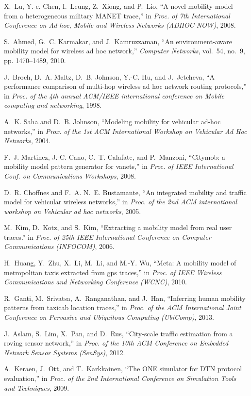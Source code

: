 \documentclass[10pt,conference,compsocconf,letterpaper]{IEEEtran}
\begin{document}
\begin{thebibliography}{10}

X.~Lu, Y.-c. Chen, I.~Leung, Z.~Xiong, and P.~Lio, ``A novel mobility model
  from a heterogeneous military MANET trace,'' in \emph{Proc. of 7th International Conference on Ad-hoc, Mobile and Wireless Networks (ADHOC-NOW)}, 2008.

S.~Ahmed, G.~C. Karmakar, and J.~Kamruzzaman, ``An environment-aware mobility
  model for wireless ad hoc network,'' \emph{Computer Networks}, vol.~54,
  no.~9, pp. 1470--1489, 2010.

J.~Broch, D.~A. Maltz, D.~B. Johnson, Y.-C. Hu, and J.~Jetcheva, ``A
  performance comparison of multi-hop wireless ad hoc network routing
  protocols,'' in \emph{Proc. of the 4th annual ACM/IEEE international
  conference on Mobile computing and networking}, 1998.

A.~K. Saha and D.~B. Johnson, ``Modeling mobility for vehicular ad-hoc
  networks,'' in \emph{Prox. of the 1st ACM International Workshop on
  Vehicular Ad Hoc Networks}, 2004.

F.~J. Martinez, J.-C. Cano, C.~T. Calafate, and P.~Manzoni, ``Citymob: a
  mobility model pattern generator for vanets,'' in \emph{Proc. of IEEE International Conf. on Communications Workshops}, 2008.

D.~R. Choffnes and F.~A. N.~E. Bustamante, ``An integrated mobility and traffic
  model for vehicular wireless networks,'' in \emph{Proc. of the 2nd ACM
  international workshop on Vehicular ad hoc networks}, 2005.

M.~Kim, D.~Kotz, and S.~Kim, ``Extracting a mobility model from real user
  traces.'' in \emph{Proc. of 25th IEEE International Conference on
  Computer Communications (INFOCOM)}, 2006.

H.~Huang, Y.~Zhu, X.~Li, M.~Li, and M.-Y. Wu, ``Meta: A mobility model of
  metropolitan taxis extracted from gps traces,'' in \emph{Proc. of IEEE Wireless
  Communications and Networking Conference (WCNC)}, 2010.

R.~Ganti, M.~Srivatsa, A.~Ranganathan, and J.~Han, ``Inferring human mobility
  patterns from taxicab location traces,'' in \emph{Proc. of the ACM
  International Joint Conference on Pervasive and Ubiquitous Computing (UbiComp)}, 2013.

J.~Aslam, S.~Lim, X.~Pan, and D.~Rus, ``City-scale traffic estimation from a
  roving sensor network,'' in \emph{Proc. of the 10th ACM Conference on
  Embedded Network Sensor Systems (SenSys)}, 2012.

A.~Keraen, J.~Ott, and T.~Karkkainen, ``The {ONE} simulator for {DTN} protocol
  evaluation,'' in \emph{Proc. of the 2nd International Conference on
  Simulation Tools and Techniques}, 2009.

\end{thebibliography}


%
\end{document}
